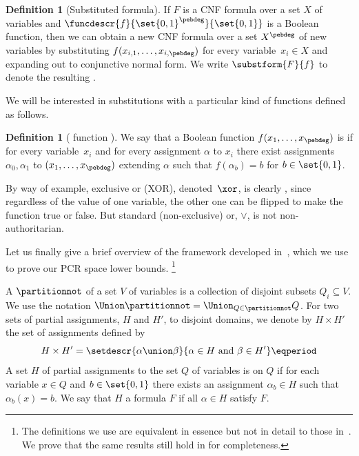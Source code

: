 \documentclass[11pt]{article}
\numberwithin{equation}{section}
\theoremstyle{definition}
\newtheorem{definition}[theorem]{Definition}
\theoremstyle{plain}
\begin{document}
%
%
%
%
%
%
%
%

\begin{definition}[Substituted formula]
  \label{def:substituted-formula}
If $F$ is a CNF formula over a set %
$X$ of variables  %
and
$\funcdescr{f}{\set{0, 1}^{\pebdeg}}{\set{0, 1}}$
is a Boolean function, then 
we can obtain a new CNF formula over a set
%
$X^{\pebdeg}$ of new variables  %
by
%
substituting $f(x_{i,1}, \ldots, x_{i,\pebdeg})$ for every variable~$x_i\in X$
%
%
%
%
and expanding out to conjunctive normal form. We write 
$\substform{F}{f}$   %
%
to denote the resulting . %
\end{definition}
We will be
interested in substitutions with a
particular kind of functions defined as follows.

\begin{definition}[\Nonauthor{} function
  \cite{BN11UnderstandingSpace}]
  \label{def:nonauth-func}
  We say that
  a Boolean function $f(x_1, \ldots, x_{\pebdeg})$ is
  \introduceterm{\nonauthor{}} if for every
  variable~$x_i$ %
  and for every
  assignment $\alpha$ to
  $x_i$ there exist %
%
assignments  %
$\alpha_0, \alpha_1$
to $(x_1,\dots,x_{\pebdeg})$   %
%
%
%
%
extending $\alpha$ such that $f(\alpha_b) = b$ for $b \in \set{0, 1}$.
\end{definition}

By way of example, exclusive or (XOR), denoted~$\xor$, 
is clearly \nonauthor, since regardless of the
value of one variable, the other one can be flipped to make the
function true or false.  %
%
But standard (non-exclusive) or, $\lor$, is not non-authoritarian.  %
%
%
%
%

%
%
Let us finally give a brief overview of the framework developed
in~\cite{BG15Framework},
which we use to prove our PCR space lower bounds.%
%
%
%
%
%
%
\footnote{The definitions we use are equivalent in essence but not in detail to those in~\cite{BG15Framework}.
%
%
%
%
We prove that the same results still hold in
%
%
    for completeness.}

A 
$\partitionnot$ of a
%
set $V$ of variables  %
is a collection of disjoint %
subsets  %
$Q_i\subseteq V$. 
We use the notation $\Union \partitionnot =
%
%
\Union_{Q\in\partitionnot} Q$. %
For two sets of partial
assignments, $H$ and $H'$, %
to disjoint domains, we denote by $H \times H'$ the set of 
assignments %
%
%
%
defined by \[ H \times H' = \setdescr{\alpha \union
  \beta}{\alpha \in H \text{\ and\ } \beta \in H'} \eqperiod\] %
A set %
$H$ of partial assignments  %
to the %
%
set $Q$ of variables  %
is
\introduceterm{\flippable{}} on $Q$ if for each
variable $x \in Q$ and $b \in \set{0, 1}$ there exists an assignment
$\alpha_b \in H$ such that $\alpha_b(x) = b$. 
%
We say that
$H$  a formula $F$ if all 
$\alpha \in H$
%
satisfy $F$.
\end{document}
